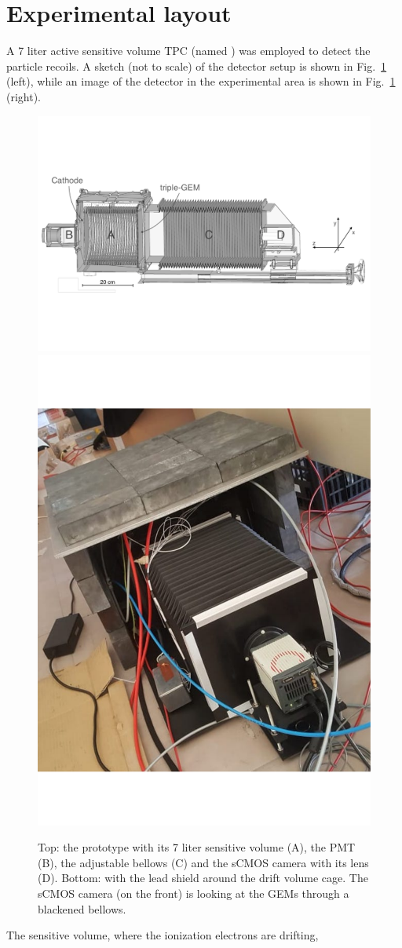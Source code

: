 \documentclass[12pt]{iopart}
\begin{document}
\section{Experimental layout}
\label{sec:layout}
A 7 liter active sensitive volume TPC (named \lemon) was employed to
detect the particle recoils. A sketch (not to scale) of the detector
setup is shown in Fig.~\ref{fig:lemon} (left), while an image of the
detector in the experimental area is shown in Fig.~\ref{fig:lemon}
(right).
% 
\begin{figure}[ht]
	\centering
	\includegraphics[width=0.90\linewidth]{figures/lemon.pdf} \\
        \includegraphics[width=0.30\linewidth]{LEMON-Shielded.pdf}
  	\caption{Top: the \lemon prototype with  its 7 liter sensitive
          volume (A), the PMT (B), the adjustable bellows (C) and the
          sCMOS camera with its lens (D). Bottom: \lemon
          with the lead shield around the drift volume cage. The sCMOS
          camera (on the front) is looking at the GEMs through a
          blackened bellows.
  	\label{fig:lemon}}
\end{figure}
%
The sensitive volume, where the ionization electrons are drifting,
\end{document}
